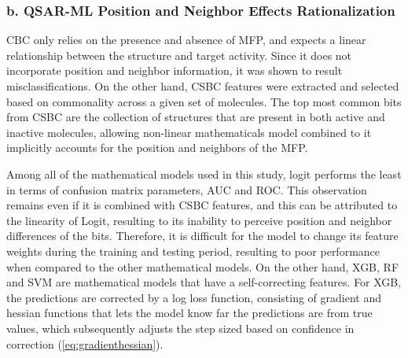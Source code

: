    

\subsubsection*{b. QSAR-ML Position and Neighbor Effects Rationalization}
CBC only relies on the presence and absence of MFP, and expects a linear relationship between the structure and target activity. Since it does not incorporate position and neighbor information, it was shown to result misclassifications. On the other hand, CSBC features were extracted and selected based on commonality across a given set of molecules. The top most common bits from CSBC are the collection of structures that are present in both active and inactive molecules, allowing non-linear mathematicals model combined to it implicitly accounts for the position and neighbors of the MFP. 

Among all of the mathematical models used in this study, logit performs the least in terms of confusion matrix parameters, AUC and ROC. This observation remains even if it is combined with CSBC features, and this can be attributed to the linearity of Logit, resulting to its inability to perceive position and neighbor differences of the bits. Therefore, it is difficult for the model to change its feature weights during the training and testing period, resulting to poor performance when compared to the other mathematical models. On the other hand, XGB, RF and SVM are mathematical models that have a self-correcting features. For XGB, the predictions are corrected by a log loss function, consisting of gradient and hessian functions that lets the model know far the predictions are from true values, which subsequently adjusts the step sized based on confidence in correction (\ref{eq:gradienthessian}). 

